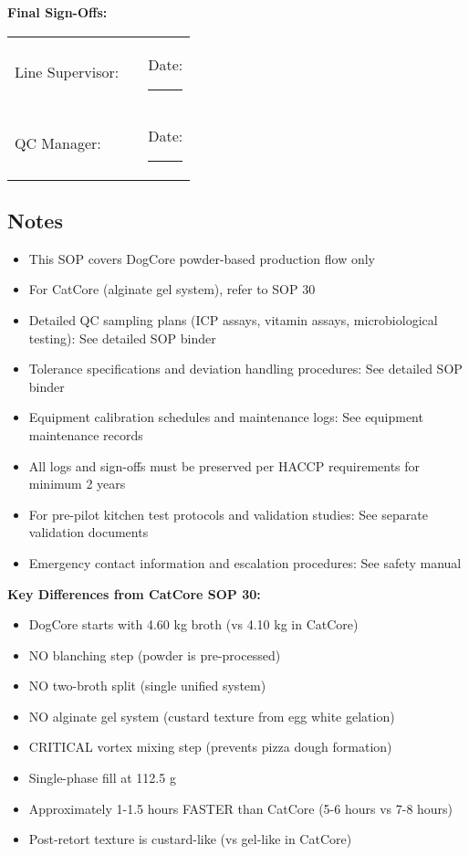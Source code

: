 \noindent\textbf{Final Sign-Offs:}

\begin{tabular}{@{}lp{5cm}p{5cm}@{}}
Line Supervisor: & \rule{4cm}{0.4pt} & Date: \rule{3cm}{0.4pt} \\
QC Manager: & \rule{4cm}{0.4pt} & Date: \rule{3cm}{0.4pt} \\
\end{tabular}


\clearpage
\subsection*{Notes}

\begin{itemize}[leftmargin=1.5em]
\item This SOP covers DogCore powder-based production flow only
\item For CatCore (alginate gel system), refer to SOP 30
\item Detailed QC sampling plans (ICP assays, vitamin assays, microbiological testing): See detailed SOP binder
\item Tolerance specifications and deviation handling procedures: See detailed SOP binder
\item Equipment calibration schedules and maintenance logs: See equipment maintenance records
\item All logs and sign-offs must be preserved per HACCP requirements for minimum 2 years
\item For pre-pilot kitchen test protocols and validation studies: See separate validation documents
\item Emergency contact information and escalation procedures: See safety manual
\end{itemize}

\vspace{1em}
\noindent\textbf{Key Differences from CatCore SOP 30:}
\begin{itemize}[leftmargin=1.5em]
\item DogCore starts with 4.60 kg broth (vs 4.10 kg in CatCore)
\item NO blanching step (powder is pre-processed)
\item NO two-broth split (single unified system)
\item NO alginate gel system (custard texture from egg white gelation)
\item CRITICAL vortex mixing step (prevents pizza dough formation)
\item Single-phase fill at 112.5 g 
\item Approximately 1-1.5 hours FASTER than CatCore (5-6 hours vs 7-8 hours)
\item Post-retort texture is custard-like (vs gel-like in CatCore)
\end{itemize}

